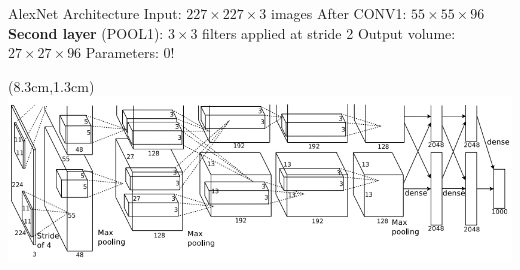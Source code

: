 \documentclass[serif, aspectratio=169]{beamer}
\begin{document}
\begin{frame}{AlexNet Architecture}
	\vspace{1cm}
	Input: $227 \times 227 \times 3$ images \newline 
	After CONV1: $55 \times 55 \times 96$ \vspace{0.3cm} \newline
	\textbf{Second layer} (POOL1): $3 \times 3$ filters applied at stride 2 \newline 
	Output volume: $27 \times 27 \times 96$ \newline
	Parameters: 0!
	
	\begin{textblock*}{5cm}(8.3cm,1.3cm) %
		\includegraphics[keepaspectratio, scale=0.25]{pic/alexnet}
	\end{textblock*}
\end{frame}
\end{document}
